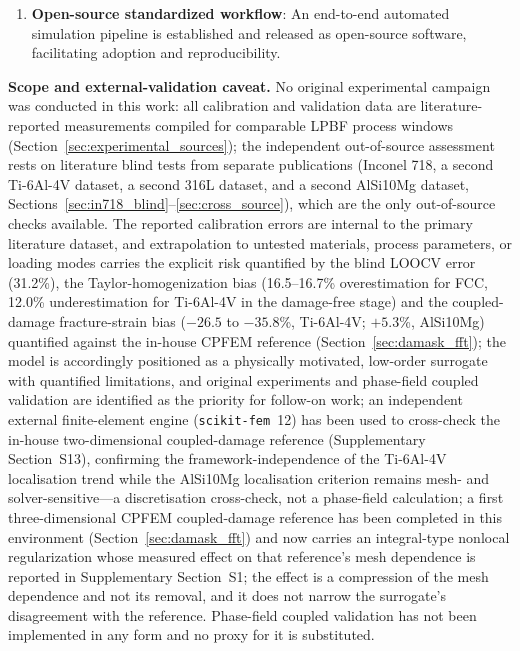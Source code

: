 \documentclass[twocolumn]{sagej}
\begin{document}
\begin{enumerate}
    \item \textbf{Open-source standardized workflow}: An end-to-end automated simulation pipeline is established and released as open-source software, facilitating adoption and reproducibility.
\end{enumerate}

\textbf{Scope and external-validation caveat.} No original experimental campaign was conducted in this work: all calibration and validation data are literature-reported measurements compiled for comparable LPBF process windows (Section~\ref{sec:experimental_sources}); the independent out-of-source assessment rests on literature blind tests from separate publications (Inconel 718, a second Ti-6Al-4V dataset, a second 316L dataset, and a second AlSi10Mg dataset, Sections~\ref{sec:in718_blind}--\ref{sec:cross_source}), which are the only out-of-source checks available. The reported calibration errors are internal to the primary literature dataset, and extrapolation to untested materials, process parameters, or loading modes carries the explicit risk quantified by the blind LOOCV error (31.2\%), the Taylor-homogenization bias (16.5--16.7\% overestimation for FCC, 12.0\% underestimation for Ti-6Al-4V in the damage-free stage) and the coupled-damage fracture-strain bias ($-26.5$ to $-35.8$\%, Ti-6Al-4V; $+5.3$\%, AlSi10Mg) quantified against the in-house CPFEM reference (Section~\ref{sec:damask_fft}); the model is accordingly positioned as a physically motivated, low-order surrogate with quantified limitations, and original experiments and phase-field coupled validation are identified as the priority for follow-on work; an independent external finite-element engine (\texttt{scikit-fem}~12) has been used to cross-check the in-house two-dimensional coupled-damage reference (Supplementary Section~S13), confirming the framework-independence of the Ti-6Al-4V localisation trend while the AlSi10Mg localisation criterion remains mesh- and solver-sensitive---a discretisation cross-check, not a phase-field calculation; a first three-dimensional CPFEM coupled-damage reference has been completed in this environment (Section~\ref{sec:damask_fft}) and now carries an integral-type nonlocal regularization whose measured effect on that reference's mesh dependence is reported in Supplementary Section~S1; the effect is a compression of the mesh dependence and not its removal, and it does not narrow the surrogate's disagreement with the reference. Phase-field coupled validation has not been implemented in any form and no proxy for it is substituted.
\end{document}
